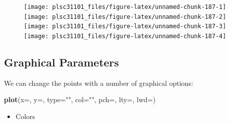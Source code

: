 \documentclass[]{book}
\newenvironment{Shaded}{\begin{snugshade}}{\end{snugshade}}
\newcommand{\KeywordTok}[1]{\textcolor[rgb]{0.13,0.29,0.53}{\textbf{#1}}}
\newcommand{\DataTypeTok}[1]{\textcolor[rgb]{0.13,0.29,0.53}{#1}}
\newcommand{\DecValTok}[1]{\textcolor[rgb]{0.00,0.00,0.81}{#1}}
\newcommand{\StringTok}[1]{\textcolor[rgb]{0.31,0.60,0.02}{#1}}
\newcommand{\CommentTok}[1]{\textcolor[rgb]{0.56,0.35,0.01}{\textit{#1}}}
\newcommand{\OperatorTok}[1]{\textcolor[rgb]{0.81,0.36,0.00}{\textbf{#1}}}
\newcommand{\NormalTok}[1]{#1}
\providecommand{\tightlist}{%
  \setlength{\itemsep}{0pt}\setlength{\parskip}{0pt}}
\begin{document}
\begin{figure}

{\centering \texttt{[image: plsc31101\_files/figure-latex/unnamed-chunk-187-1]} \texttt{[image: plsc31101\_files/figure-latex/unnamed-chunk-187-2]} \texttt{[image: plsc31101\_files/figure-latex/unnamed-chunk-187-3]} \texttt{[image: plsc31101\_files/figure-latex/unnamed-chunk-187-4]} 

}

\caption{ }\label{fig:unnamed-chunk-187}
\end{figure}

\subsection{Graphical Parameters}\label{graphical-parameters}

We can change the points with a number of graphical options:

\begin{Shaded}
\begin{Highlighting}[]
\KeywordTok{plot}\NormalTok{(}\DataTypeTok{x=}\NormalTok{, }\DataTypeTok{y=}\NormalTok{, }\DataTypeTok{type=}\StringTok{""}\NormalTok{, }\DataTypeTok{col=}\StringTok{""}\NormalTok{, }\DataTypeTok{pch=}\NormalTok{, }\DataTypeTok{lty=}\NormalTok{, }\DataTypeTok{lwd=}\NormalTok{)}
\end{Highlighting}
\end{Shaded}

\begin{itemize}
\tightlist
\item
  Colors
\end{itemize}

\begin{Shaded}
\end{Shaded}
\end{document}
